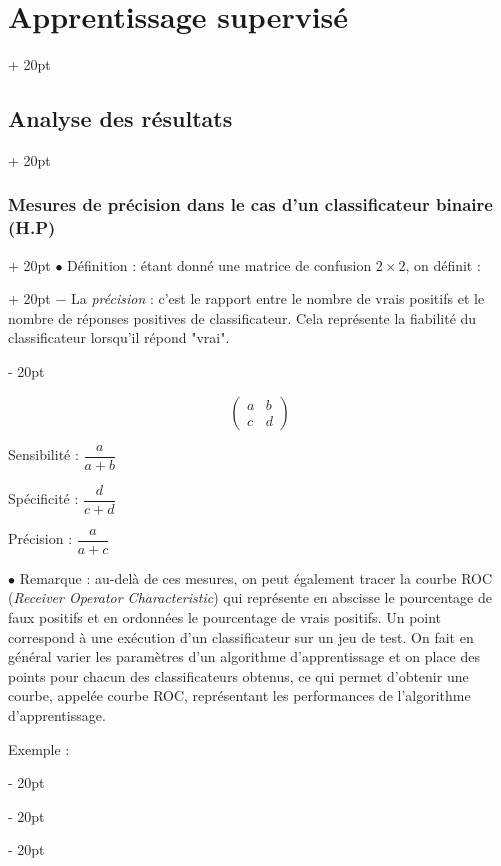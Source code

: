 \documentclass[a4paper, 12pt, twoside]{article}
\newcommand{\ind}[1][20pt]{\advance\leftskip + #1}
\newcommand{\deind}[1][20pt]{\advance\leftskip - #1}
\newenvironment{indt}[2][20pt]{#2 \par \ind[#1]}{\par \deind} %
\begin{document}
\begin{indt}{\section{Apprentissage supervisé}}
\begin{indt}{\subsection{Analyse des résultats}}
\begin{indt}{\subsubsection{Mesures de précision dans le cas d'un classificateur binaire (H.P)}}
\begin{indt}{$\bullet$ Définition : étant donné une matrice de confusion $2 \times 2$, on définit :}
                    $-$ La \emph{précision} : c'est le rapport entre le nombre de vrais positifs et le nombre de réponses positives de classificateur.
                    Cela représente la fiabilité du classificateur lorsqu'il répond "vrai".
                \end{indt}

                \[
                    \begin{pmatrix}
                        a & b
                        \\
                        c & d
                    \end{pmatrix}
                \]

                Sensibilité : $\dfrac{a}{a + b}$

                Spécificité : $\dfrac{d}{c + d}$

                Précision : $\dfrac{a}{a + c}$

                \vspace{12pt}
                
                $\bullet$ Remarque : au-delà de ces mesures, on peut également tracer la courbe ROC (\textit{Receiver Operator Characteristic}) qui représente en abscisse le pourcentage de faux positifs et en ordonnées le pourcentage de vrais positifs. Un point correspond à une exécution d'un classificateur sur un jeu de test. On fait en général varier les paramètres d'un algorithme d'apprentissage et on place des points pour chacun des classificateurs obtenus, ce qui permet d'obtenir une courbe, appelée courbe ROC, représentant les performances de l'algorithme d'apprentissage.

                \vspace{12pt}
                
                Exemple :

                \begin{center}
\end{center}
\end{indt}
\end{indt}
\end{indt}
\end{document}
